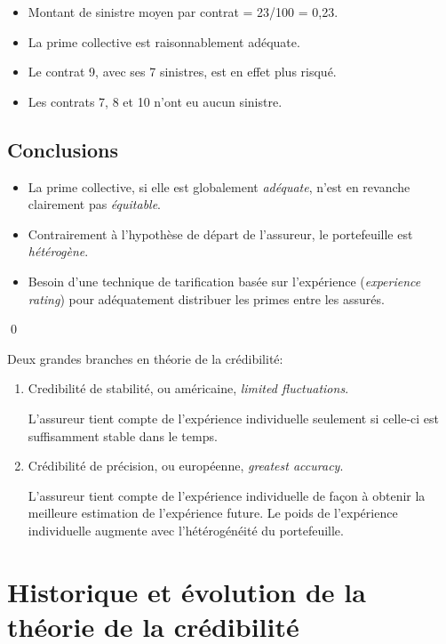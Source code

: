 \begin{exemple}
\begin{itemize}
\item Montant de sinistre moyen par contrat = 23/100 = 0,23.
\item La prime collective est raisonnablement adéquate.
\item Le contrat 9, avec ses 7 sinistres, est en effet plus risqué.
\item Les contrats 7, 8 et 10 n'ont eu aucun sinistre.
\end{itemize}



\subsection*{Conclusions}

\begin{itemize}
\item La prime collective, si elle est globalement \emph{adéquate},
  n'est en revanche clairement pas \emph{équitable}.
\item Contrairement à l'hypothèse de départ de l'assureur, le
  portefeuille est \emph{hétérogène}.
\item Besoin d'une technique de tarification basée sur l'expérience
  (\emph{experience rating}) pour adéquatement distribuer les primes
  entre les assurés.
\end{itemize}
  \qed
\end{exemple}

Deux grandes branches en théorie de la crédibilité:
\begin{enumerate}
\item Credibilité de stabilité, ou américaine, \emph{limited
    fluctuations}.

  L'assureur tient compte de l'expérience individuelle seulement si
  celle-ci est suffisamment stable dans le temps.

\item Crédibilité de précision, ou européenne, \emph{greatest
    accuracy}.

  L'assureur tient compte de l'expérience individuelle de façon à
  obtenir la meilleure estimation de l'expérience future. Le poids de
  l'expérience individuelle augmente avec l'hétérogénéité du
  portefeuille.
\end{enumerate}


\section{Historique et évolution de la théorie de la crédibilité}
\label{sec:introduction-historique:historique}

